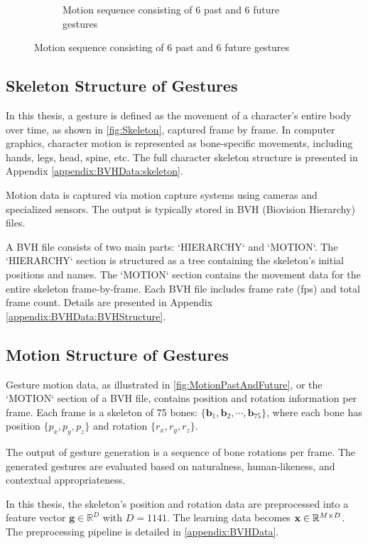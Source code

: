 \begin{figure}[h]
\begin{subfigure}{0.49\textwidth}
		\caption{\small Motion sequence consisting of 6 past and 6 future gestures}
		\label{fig:MotionPastAndFuture}
	\end{subfigure}
\end{figure}

\subsection{Skeleton Structure of Gestures}

In this thesis, a gesture is defined as the movement of a character's entire body over time, as shown in \autoref{fig:Skeleton}, captured frame by frame. In computer graphics, character motion is represented as bone-specific movements, including hands, legs, head, spine, etc. The full character skeleton structure is presented in Appendix \autoref{appendix:BVHData:skeleton}.

Motion data is captured via motion capture systems using cameras and specialized sensors. The output is typically stored in BVH (Biovision Hierarchy) files.

A BVH file consists of two main parts: `HIERARCHY` and `MOTION`. The `HIERARCHY` section is structured as a tree containing the skeleton’s initial positions and names. The `MOTION` section contains the movement data for the entire skeleton frame-by-frame. Each BVH file includes frame rate (fps) and total frame count. Details are presented in Appendix \autoref{appendix:BVHData:BVHStructure}.

\subsection{Motion Structure of Gestures}

Gesture motion data, as illustrated in \autoref{fig:MotionPastAndFuture}, or the `MOTION` section of a BVH file, contains position and rotation information per frame. Each frame is a skeleton of 75 bones: $\{ \textbf{b}_{1}, \textbf{b}_{2}, \cdots , \textbf{b}_{75} \}$, where each bone has position $\{ p_{x}, p_{y}, p_{z} \}$ and rotation $\{ r_{x}, r_{y}, r_{z} \}$.

The output of gesture generation is a sequence of bone rotations per frame. The generated gestures are evaluated based on naturalness, human-likeness, and contextual appropriateness.

In this thesis, the skeleton’s position and rotation data are preprocessed into a feature vector $\mathbf{g} \in \mathbb{R}^{D}$ with $D = 1141$. The learning data becomes $\mathbf{x} \in \mathbb{R}^{M \times D}$. The preprocessing pipeline is detailed in \autoref{appendix:BVHData}.

